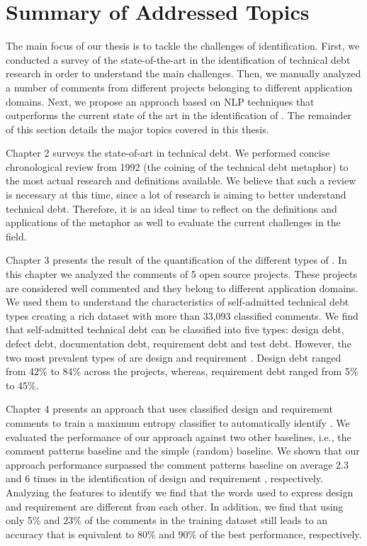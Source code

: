 
\section{Summary of Addressed Topics}

The main focus of our thesis is to tackle the challenges of \SATD identification. First, we conducted a survey of the state-of-the-art in the identification of technical debt research in order to understand the main challenges. Then, we manually analyzed a number of comments from different projects belonging to different application domains. Next, we propose an approach based on NLP techniques that outperforms the current state of the art in the identification of \SATD. The remainder of this section details the major topics covered in this thesis.

Chapter 2 surveys the state-of-art in technical debt. We performed concise chronological review from 1992 (the coining of the technical debt metaphor) to the most actual research and definitions available. We believe that such a review is necessary at this time, since a lot of research is aiming to better understand technical debt. Therefore, it is an ideal time to reflect on the definitions and applications of the metaphor as well to evaluate the current challenges in the field.

Chapter 3 presents the result of the quantification of the different types of \SATD. In this chapter we analyzed the comments of 5 open source projects. These projects are considered well commented and they belong to different application domains. We used them to understand the characteristics of self-admitted technical debt types creating a rich dataset with more than 33,093 classified comments. We find that self-admitted technical debt can be classified into five types: design debt, defect debt, documentation debt, requirement debt and test debt. However, the two most prevalent types of \SATD are design and requirement \SATD. Design debt ranged from 42\% to 84\% across the projects, whereas, requirement debt ranged from 5\% to 45\%. 

Chapter 4 presents an approach that uses classified design and requirement \SATD comments to train a maximum entropy classifier to automatically identify \SATD. We evaluated the performance of our approach against two other baselines, i.e., the comment patterns baseline and the simple (random) baseline. We shown that our approach performance surpassed the comment patterns baseline on average 2.3 and 6 times in the identification of design and requirement \SATD, respectively. Analyzing the features to identify \SATD we find that the words used to express design and requirement \SATD are different from each other. In addition, we find that using only 5\% and 23\% of the comments in the training dataset still leads to an accuracy that is equivalent to 80\% and 90\% of the best performance, respectively.

